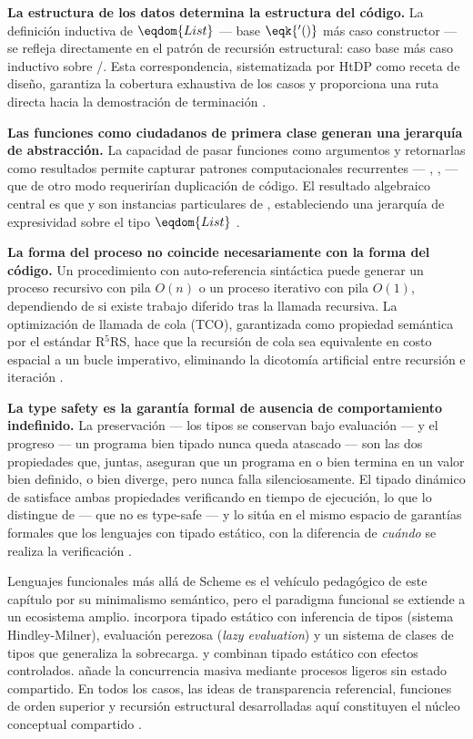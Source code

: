 \textbf{La estructura de los datos determina la estructura del código.} La definición inductiva de $\eqdom{List}$ — base $\eqk{'()}$ más caso constructor  — se refleja directamente en el patrón de recursión estructural: caso base  más caso inductivo sobre /. Esta correspondencia, sistematizada por HtDP como receta de diseño, garantiza la cobertura exhaustiva de los casos y proporciona una ruta directa hacia la demostración de terminación \cite{HtDP, PFPL}.

\textbf{Las funciones como ciudadanos de primera clase generan una jerarquía de abstracción.} La capacidad de pasar funciones como argumentos y retornarlas como resultados permite capturar patrones computacionales recurrentes — , ,  — que de otro modo requerirían duplicación de código. El resultado algebraico central es que  y  son instancias particulares de , estableciendo una jerarquía de expresividad sobre el tipo $\eqdom{List}$ \cite{SICP}.

\textbf{La forma del proceso no coincide necesariamente con la forma del código.} Un procedimiento con auto-referencia sintáctica puede generar un proceso recursivo con pila $O(n)$ o un proceso iterativo con pila $O(1)$, dependiendo de si existe trabajo diferido tras la llamada recursiva. La optimización de llamada de cola (TCO), garantizada como propiedad semántica por el estándar R$^5$RS, hace que la recursión de cola sea equivalente en costo espacial a un bucle imperativo, eliminando la dicotomía artificial entre recursión e iteración \cite{SICP, PFPL}.

\textbf{La type safety es la garantía formal de ausencia de comportamiento indefinido.} La preservación — los tipos se conservan bajo evaluación — y el progreso — un programa bien tipado nunca queda atascado — son las dos propiedades que, juntas, aseguran que un programa en  o bien termina en un valor bien definido, o bien diverge, pero nunca falla silenciosamente. El tipado dinámico de  satisface ambas propiedades verificando en tiempo de ejecución, lo que lo distingue de  — que no es type-safe — y lo sitúa en el mismo espacio de garantías formales que los lenguajes con tipado estático, con la diferencia de \textit{cuándo} se realiza la verificación \cite{PFPL, TAPL}.

\begin{observacion}{Lenguajes funcionales más allá de Scheme}
 es el vehículo pedagógico de este capítulo por su minimalismo semántico, pero el paradigma funcional se extiende a un ecosistema amplio.  incorpora tipado estático con inferencia de tipos (sistema Hindley-Milner), evaluación perezosa (\textit{lazy evaluation}) y un sistema de clases de tipos que generaliza la sobrecarga.  y  combinan tipado estático con efectos controlados.  añade la concurrencia masiva mediante procesos ligeros sin estado compartido. En todos los casos, las ideas de transparencia referencial, funciones de orden superior y recursión estructural desarrolladas aquí constituyen el núcleo conceptual compartido \cite{SICP, HtDP}.
\end{observacion}

\printbibliography[segment=\therefsegment, heading=subbibliography]